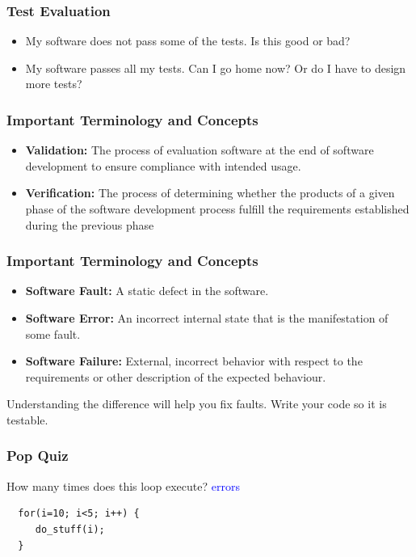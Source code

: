 \documentclass{beamer}
\begin{document}
\begin{frame}
  \frametitle{Test Evaluation}
  \begin{itemize}
  \item My software does not pass some of the tests. Is this good or
    bad?
  \item My software passes all my tests. Can I go home now? Or do I
    have to design more tests?
  \end{itemize}
\end{frame}
\begin{frame}
  \frametitle{Important Terminology and Concepts}

  \begin{itemize}
  \item {\bf Validation:} The process of evaluation software at the end
    of software development to ensure compliance with intended usage.
  \item {\bf Verification:} The process of determining whether the
    products of a given phase of the software development process
    fulfill the requirements established during the previous phase
  \end{itemize}
  
\end{frame}
\begin{frame}
  \frametitle{Important Terminology and Concepts}
  \begin{itemize}
  \item  {\bf Software Fault:} A static defect in the software.
  \item {\bf Software Error:} An incorrect internal state that is the
    manifestation of some fault. 
  \item {\bf  Software Failure:} External,
    incorrect behavior with respect to the requirements or other
    description of the expected behaviour.
  \end{itemize}
Understanding the difference will help you fix faults. Write your code
so it is testable.
\end{frame}
\begin{frame}[fragile]
  \frametitle{Pop Quiz}
  How many times does this loop execute?
 \textcolor{blue}{errors}\begin{lstlisting}
  for(i=10; i<5; i++) {
     do_stuff(i);
  }
\end{lstlisting}

\end{frame}
\end{document}
